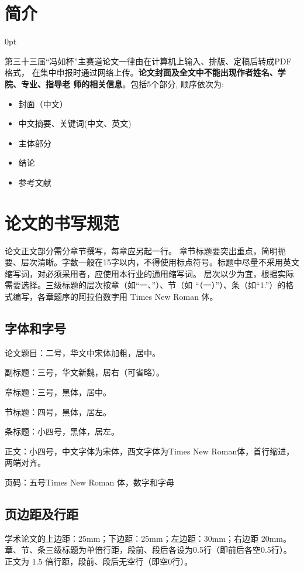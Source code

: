\documentclass[zihao=-4]{ctexart}
\newcommand{\setParDis}{\setlength {\parskip} {0pt} }
\begin{document}
\section{简介}
\setParDis %
\begin{spacing}{1.5}
  第三十三届“冯如杯”主赛道论文一律由在计算机上输入、排版、定稿后转成PDF格式，
在集中申报时通过网络上传。\textbf{论文封面及全文中不能出现作者姓名、学院、专业、指导老
师的相关信息}。包括5个部分, 顺序依次为: \par 
  \begin{itemize}
    \item 封面（中文）
    \item 中文摘要、关键词(中文、英文)
    \item 主体部分
    \item 结论
    \item 参考文献
  \end{itemize}

\section{论文的书写规范}

论文正文部分需分章节撰写，每章应另起一行。
章节标题要突出重点，简明扼要、层次清晰。字数一般在15字以内，不得使用标点符号。标题中尽量不采用英文缩写词，对必须采用者，应使用本行业的通用缩写词。  层次以少为宜，根据实际需要选择。三级标题的层次按章（如“一、”）、节（如 “（一）”）、条（如“1.”）的格式编写，各章题序的阿拉伯数字用 Times New Roman 体。  

\subsection{字体和字号}
论文题目：二号，华文中宋体加粗，居中。

副标题：三号，华文新魏，居右（可省略）。

章标题：三号，黑体，居中。

节标题：四号，黑体，居左。

条标题：小四号，黑体，居左。

正文：小四号，中文字体为宋体，西文字体为Times New Roman体，首行缩进，两端对齐。

页码：五号Times New Roman 体，数字和字母\par

\subsection{页边距及行距}
学术论文的上边距：25mm；下边距：25mm；左边距：30mm；右边距 20mm。
章、节、条三级标题为单倍行距，段前、段后各设为0.5行（即前后各空0.5行）。
正文为 1.5 倍行距，段前、段后无空行（即空0行）。


\end{spacing}
\end{document}

